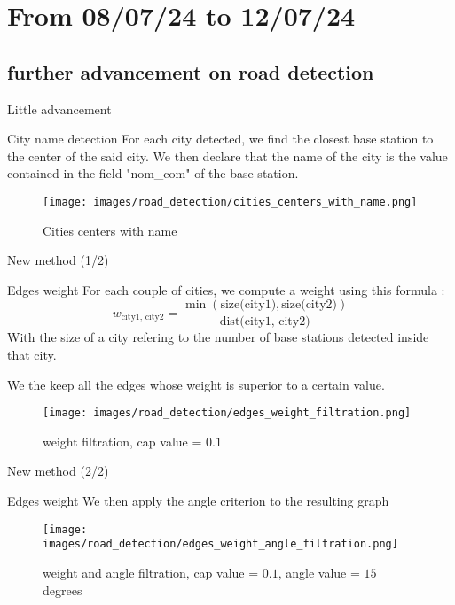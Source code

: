 \smallframetitle

\section{From 08/07/24 to 12/07/24}
\insertsectionframe

\subsection{further advancement on road detection}
\insertsubsectionframe

\begin{frame}{Little advancement}
    \begin{block}{City name detection}
        For each city detected, we find the closest base station to the center of the said city. 
        We then declare that the name of the city is the value contained in the field "nom\_com" of the base station.
    \end{block}

    \begin{figure}
        \texttt{[image: images/road\_detection/cities\_centers\_with\_name.png]}
        \caption{Cities centers with name}
    \end{figure}
\end{frame}

\begin{frame}{New method (1/2)}
    \begin{block}{Edges weight}
        For each couple of cities, we compute a weight using this formula :
        $$w_{\text{city1, city2}} = \frac{\min(\text{size(city1)},\text{size(city2)})}{\text{dist(city1, city2)}}$$
        With the size of a city refering to the number of base stations detected inside that city.
        
        We the keep all the edges whose weight is superior to a certain value.
    \end{block}

    \begin{figure}
        \texttt{[image: images/road\_detection/edges\_weight\_filtration.png]}
        \caption{weight filtration, cap value = $0.1$}
    \end{figure}
\end{frame} 

\begin{frame}{New method (2/2)}
    \begin{block}{Edges weight}
        We then apply the angle criterion to the resulting graph
    \end{block}

    \begin{figure}
        \texttt{[image: images/road\_detection/edges\_weight\_angle\_filtration.png]}
        \caption{weight and angle filtration, cap value = $0.1$, angle value = $15$ degrees}
    \end{figure}
\end{frame} 
